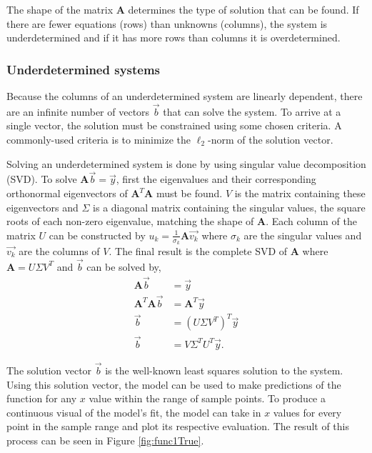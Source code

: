 The shape of the matrix $\mathbf{A}$ determines the type of solution that can be found.  If there are fewer equations (rows) than unknowns (columns), the system is underdetermined and if it has more rows than columns it is overdetermined.  


\subsubsection{Underdetermined systems}
Because the columns of an underdetermined system are linearly dependent, there are an infinite number of vectors $\vec{b}$ that can solve the system.  To arrive at a single vector, the solution must be constrained using some chosen criteria.  A commonly-used criteria is to minimize the $\ell_2$-norm of the solution vector. 

\par Solving an underdetermined system is done by using singular value decomposition (SVD). To solve $\mathbf{A}\vec{b}=\vec{y}$, first the eigenvalues and their corresponding orthonormal eigenvectors of $\mathbf{A}^T\mathbf{A}$ must be found. $V$ is the matrix containing these eigenvectors and $\Sigma$ is a diagonal matrix containing the singular values, the square roots of each non-zero eigenvalue, matching the shape of $\mathbf{A}$. Each column of the matrix $U$ can be constructed by $u_k=\frac{1}{\sigma_k}\mathbf{A}\vec{v_k}$ where $\sigma_k$ are the singular values and $\vec{v_k}$ are the columns of $V$. The final result is the complete SVD of $\mathbf{A}$ where $\mathbf{A}=U\Sigma V^T$ and $\vec{b}$ can be solved by,
\begin{align}
\mathbf{A}\vec{b} &= \vec{y} \label{eq:Aby} \\
\mathbf{A}^T\mathbf{A}\vec{b} &= \mathbf{A}^T\vec{y} \nonumber \\
\vec{b} &= (U\Sigma V^T)^T\vec{y} \nonumber \\
\vec{b} &= V\Sigma^TU^T\vec{y}.
\end{align}

\par The solution vector $\vec{b}$ is the well-known least squares solution to the system. Using this solution vector, the model can be used to make predictions of the function for any $x$ value within the range of sample points. To produce a continuous visual of the model's fit, the model can take in $x$ values for every point in the sample range and plot its respective evaluation. The result of this process can be seen in Figure \ref{fig:func1True}.

